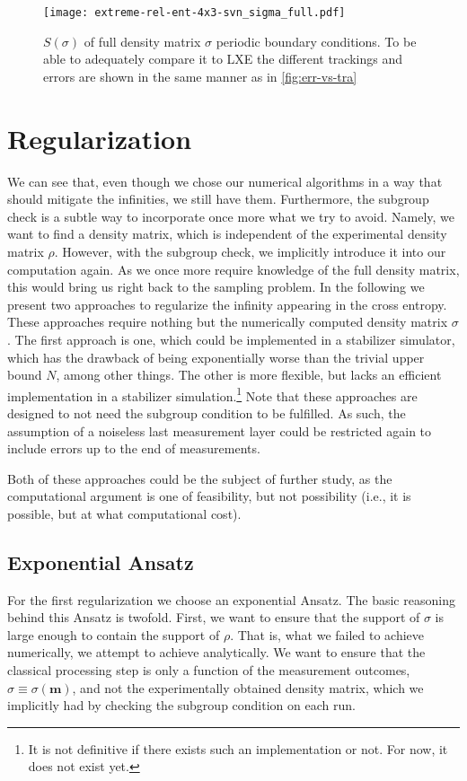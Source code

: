 \begin{figure}[p]
  \centering
  \texttt{[image: extreme-rel-ent-4x3-svn\_sigma\_full.pdf]}
  \caption{$S(\sigma)$ of full density matrix $\sigma$ 
  periodic boundary conditions. To be able to adequately compare it to LXE the
different trackings and errors are shown in the same manner as in
\cref{fig:err-vs-tra}}
  \label{fig:max_mix-svn_sigma_full-4x3}
\end{figure}

\clearpage
\section{Regularization}

We can see that, even though we chose our numerical algorithms in a way that
should mitigate the infinities, we still have them. Furthermore, the subgroup
check is a subtle way to incorporate once more what we try to avoid. Namely, we
want to find a density matrix, which is independent of the experimental density
matrix $\rho$. However, with the subgroup check, we implicitly introduce it
into our computation again. As we once more require knowledge of the full
density matrix, this would bring us right back to the sampling problem. In the
following we present two approaches to regularize the infinity appearing in the
cross entropy. These approaches require nothing but the numerically computed
density matrix $\sigma$. The first approach is one, which could be implemented
in a stabilizer simulator, which has the drawback of being exponentially worse
than the trivial upper bound $N$, among other things. The other is more
flexible, but lacks an efficient implementation in a stabilizer
simulation.\footnote{It is not definitive if there exists such an
implementation or not. For now, it does not exist yet.}
Note that these approaches are
designed to not need the subgroup condition to be fulfilled. As such, the
assumption of a noiseless last measurement layer could be restricted again to
include errors up to the end of measurements. 

Both of these approaches could be
the subject of further study, as the computational argument is one of
feasibility, but not possibility (i.e., it is possible, but at what
computational cost).

\subsection{Exponential Ansatz}
For the first regularization we choose an exponential Ansatz. The basic reasoning
behind this Ansatz is twofold. First, we want to ensure that the support of
$\sigma$ is large enough to contain the support of $\rho$. That is, what we
failed to achieve numerically, we attempt to achieve analytically. We want to
ensure that the classical processing step is only a function of the
measurement outcomes, $\sigma \equiv \sigma(\mathbf{m})$, and not the
experimentally obtained density matrix, which we implicitly had by checking the
subgroup condition on each run.

